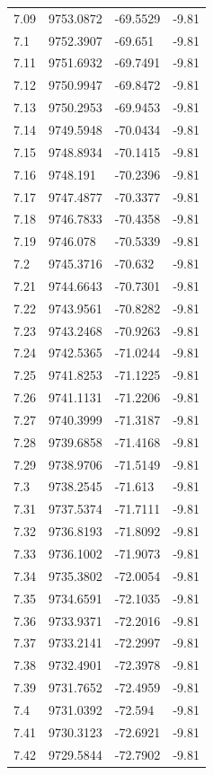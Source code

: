 \begin{table}[H]
\begin{tabular}{llll}
7.09 & 9753.0872 & -69.5529 & -9.81 \\
7.1 & 9752.3907 & -69.651 & -9.81 \\
7.11 & 9751.6932 & -69.7491 & -9.81 \\
7.12 & 9750.9947 & -69.8472 & -9.81 \\
7.13 & 9750.2953 & -69.9453 & -9.81 \\
7.14 & 9749.5948 & -70.0434 & -9.81 \\
7.15 & 9748.8934 & -70.1415 & -9.81 \\
7.16 & 9748.191 & -70.2396 & -9.81 \\
7.17 & 9747.4877 & -70.3377 & -9.81 \\
7.18 & 9746.7833 & -70.4358 & -9.81 \\
7.19 & 9746.078 & -70.5339 & -9.81 \\
7.2 & 9745.3716 & -70.632 & -9.81 \\
7.21 & 9744.6643 & -70.7301 & -9.81 \\
7.22 & 9743.9561 & -70.8282 & -9.81 \\
7.23 & 9743.2468 & -70.9263 & -9.81 \\
7.24 & 9742.5365 & -71.0244 & -9.81 \\
7.25 & 9741.8253 & -71.1225 & -9.81 \\
7.26 & 9741.1131 & -71.2206 & -9.81 \\
7.27 & 9740.3999 & -71.3187 & -9.81 \\
7.28 & 9739.6858 & -71.4168 & -9.81 \\
7.29 & 9738.9706 & -71.5149 & -9.81 \\
7.3 & 9738.2545 & -71.613 & -9.81 \\
7.31 & 9737.5374 & -71.7111 & -9.81 \\
7.32 & 9736.8193 & -71.8092 & -9.81 \\
7.33 & 9736.1002 & -71.9073 & -9.81 \\
7.34 & 9735.3802 & -72.0054 & -9.81 \\
7.35 & 9734.6591 & -72.1035 & -9.81 \\
7.36 & 9733.9371 & -72.2016 & -9.81 \\
7.37 & 9733.2141 & -72.2997 & -9.81 \\
7.38 & 9732.4901 & -72.3978 & -9.81 \\
7.39 & 9731.7652 & -72.4959 & -9.81 \\
7.4 & 9731.0392 & -72.594 & -9.81 \\
7.41 & 9730.3123 & -72.6921 & -9.81 \\
7.42 & 9729.5844 & -72.7902 & -9.81 \\

\end{tabular}
\end{table}

